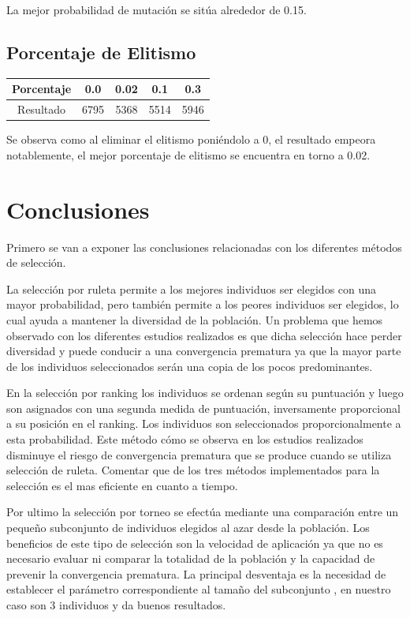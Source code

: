 \documentclass[12pt]{article}
\begin{document}
	La mejor probabilidad de mutación se sitúa alrededor de 0.15.

\subsection{Porcentaje de Elitismo}
\begin{table}[H]
\begin{center}
\begin{tabular}{|ccccc|} \hline
Porcentaje   & 0.0 & 0.02 & 0.1 & 0.3 \\  \hline
Resultado  &  6795 & 5368 & 5514 & 5946 \\ \hline
\end{tabular}
\end{center}
\end{table}

	Se observa como al eliminar el elitismo poniéndolo a 0, el resultado empeora notablemente, el mejor porcentaje de elitismo se encuentra en torno a 0.02.


\section{Conclusiones}

Primero se van a exponer las conclusiones relacionadas con los diferentes métodos de selección.

La selección por ruleta permite a los mejores individuos ser elegidos con una mayor probabilidad, pero también permite a los peores individuos ser elegidos, lo cual ayuda a mantener la diversidad de la población.
Un problema que hemos observado con los diferentes estudios realizados es que dicha selección hace perder diversidad y puede conducir a una convergencia prematura ya que la mayor parte de los individuos seleccionados serán una copia de los pocos predominantes.

En la selección por ranking los individuos se ordenan según su puntuación y luego son asignados con una segunda medida de puntuación, inversamente proporcional a su posición en el ranking. Los individuos son seleccionados proporcionalmente a esta probabilidad. Este método cómo se observa en los estudios realizados disminuye el riesgo de convergencia prematura que se produce cuando se utiliza selección de ruleta. Comentar que de los tres métodos implementados para la selección es el mas eficiente en cuanto a tiempo.


Por ultimo la selección por torneo se efectúa mediante una comparación entre un pequeño subconjunto de individuos elegidos al azar desde la población.
Los beneficios de este tipo de selección son la velocidad de aplicación ya que no es necesario evaluar ni comparar la totalidad de la población y la capacidad de prevenir la convergencia prematura. La principal desventaja es la necesidad de establecer el parámetro correspondiente al tamaño del subconjunto , en nuestro caso son 3 individuos y da buenos resultados.
\end{document}
